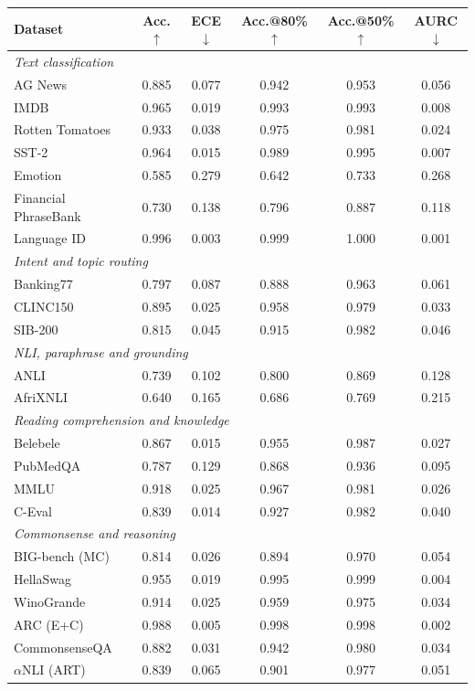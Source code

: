 \begin{tabular}{l c c c c c}
    \toprule
    Dataset & Acc.$\uparrow$ & ECE$\downarrow$ & Acc.@80\%$\uparrow$ & Acc.@50\%$\uparrow$ & AURC$\downarrow$ \\
    \midrule
    \multicolumn{6}{l}{\textit{Text classification}} \\
    AG News & 0.885 & 0.077 & 0.942 & 0.953 & 0.056 \\
    \rowcolor{gray!10}IMDB & 0.965 & 0.019 & 0.993 & 0.993 & 0.008 \\
    Rotten Tomatoes & 0.933 & 0.038 & 0.975 & 0.981 & 0.024 \\
    \rowcolor{gray!10}SST-2 & 0.964 & 0.015 & 0.989 & 0.995 & 0.007 \\
    Emotion & 0.585 & 0.279 & 0.642 & 0.733 & 0.268 \\
    \rowcolor{gray!10}Financial PhraseBank & 0.730 & 0.138 & 0.796 & 0.887 & 0.118 \\
    Language ID & 0.996 & 0.003 & 0.999 & 1.000 & 0.001 \\
    \midrule
    \multicolumn{6}{l}{\textit{Intent and topic routing}} \\
    Banking77 & 0.797 & 0.087 & 0.888 & 0.963 & 0.061 \\
    \rowcolor{gray!10}CLINC150 & 0.895 & 0.025 & 0.958 & 0.979 & 0.033 \\
    SIB-200 & 0.815 & 0.045 & 0.915 & 0.982 & 0.046 \\
    \midrule
    \multicolumn{6}{l}{\textit{NLI, paraphrase and grounding}} \\
    ANLI & 0.739 & 0.102 & 0.800 & 0.869 & 0.128 \\
    \rowcolor{gray!10}AfriXNLI & 0.640 & 0.165 & 0.686 & 0.769 & 0.215 \\
    \midrule
    \multicolumn{6}{l}{\textit{Reading comprehension and knowledge}} \\
    Belebele & 0.867 & 0.015 & 0.955 & 0.987 & 0.027 \\
    \rowcolor{gray!10}PubMedQA & 0.787 & 0.129 & 0.868 & 0.936 & 0.095 \\
    MMLU & 0.918 & 0.025 & 0.967 & 0.981 & 0.026 \\
    \rowcolor{gray!10}C-Eval & 0.839 & 0.014 & 0.927 & 0.982 & 0.040 \\
    \midrule
    \multicolumn{6}{l}{\textit{Commonsense and reasoning}} \\
    BIG-bench (MC) & 0.814 & 0.026 & 0.894 & 0.970 & 0.054 \\
    \rowcolor{gray!10}HellaSwag & 0.955 & 0.019 & 0.995 & 0.999 & 0.004 \\
    WinoGrande & 0.914 & 0.025 & 0.959 & 0.975 & 0.034 \\
    \rowcolor{gray!10}ARC (E+C) & 0.988 & 0.005 & 0.998 & 0.998 & 0.002 \\
    CommonsenseQA & 0.882 & 0.031 & 0.942 & 0.980 & 0.034 \\
    \rowcolor{gray!10}$\alpha$NLI (ART) & 0.839 & 0.065 & 0.901 & 0.977 & 0.051 \\
    \bottomrule
\end{tabular}
